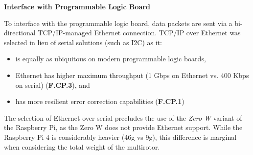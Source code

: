 \textbf{Interface with Programmable Logic Board}

To interface with the programmable logic board, data packets are sent via a bi-directional TCP/IP-managed Ethernet connection. TCP/IP over Ethernet was selected in lieu of serial solutions (such as I2C) as it:
\begin{itemize}
\item is equally as ubiquitous on modern programmable logic boards,
\item Ethernet has higher maximum throughput (1 Gbps on Ethernet vs. 400 Kbps on serial) (\textbf{F.CP.3}), and
\item has more resilient error correction capabilities (\textbf{F.CP.1})
\end{itemize} 

The selection of Ethernet over serial precludes the use of the \textit{Zero W} variant of the Raspberry Pi, as the Zero W does not provide Ethernet support. While the Raspberry Pi 4 is considerably heavier (46g vs 9g), this difference is marginal when considering the total weight of the multirotor.


